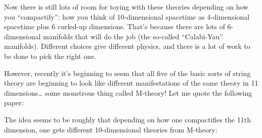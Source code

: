 \documentclass{article}
\def\tightlist{}
\renewcommand{\texttt}[1]{%
  \begingroup
  \ttfamily
  \begingroup\lccode`~=`/\lowercase{\endgroup\def~}{/\discretionary{}{}{}}%
  \begingroup\lccode`~=`[\lowercase{\endgroup\def~}{[\discretionary{}{}{}}%
  \begingroup\lccode`~=`.\lowercase{\endgroup\def~}{.\discretionary{}{}{}}%
  \catcode`/=\active\catcode`[=\active\catcode`.=\active
  \scantokens{#1\noexpand}%
  \endgroup
}
\begin{document}
Now there is still lots of room for toying with these theories depending
on how you ``compactify'': how you think of 10-dimensional spacetime as
4-dimensional spacetime plus 6 curled-up dimensions. That's because
there are lots of 6-dimensional manifolds that will do the job (the
so-called ``Calabi-Yau'' manifolds). Different choices give different
physics, and there is a lot of work to be done to pick the right one.

However, recently it's beginning to seem that all five of the basic
sorts of string theory are beginning to look like different
manifestations of the same theory in 11 dimensions\ldots{} some
monstrous thing called M-theory! Let me quote the following paper:


The idea seems to be roughly that depending on how one compactifies the
11th dimension, one gets different 10-dimensional theories from
M-theory:
\end{document}
